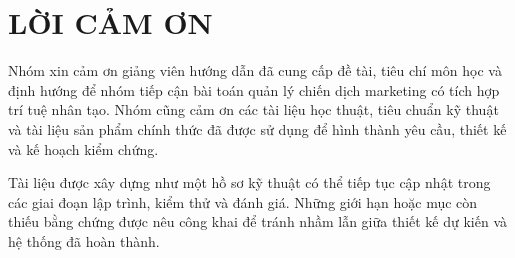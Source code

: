 \chapter*{LỜI CẢM ƠN}

Nhóm xin cảm ơn giảng viên hướng dẫn đã cung cấp đề tài, tiêu chí môn học và định hướng để nhóm tiếp cận bài toán quản lý chiến dịch marketing có tích hợp trí tuệ nhân tạo. Nhóm cũng cảm ơn các tài liệu học thuật, tiêu chuẩn kỹ thuật và tài liệu sản phẩm chính thức đã được sử dụng để hình thành yêu cầu, thiết kế và kế hoạch kiểm chứng.

Tài liệu được xây dựng như một hồ sơ kỹ thuật có thể tiếp tục cập nhật trong các giai đoạn lập trình, kiểm thử và đánh giá. Những giới hạn hoặc mục còn thiếu bằng chứng được nêu công khai để tránh nhầm lẫn giữa thiết kế dự kiến và hệ thống đã hoàn thành.


